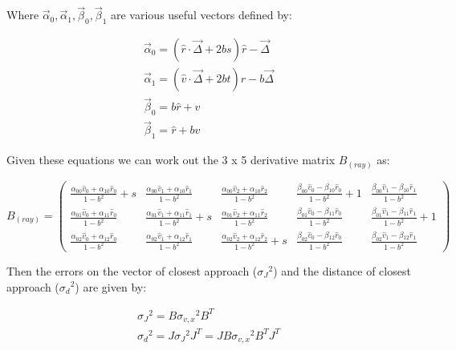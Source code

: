 \documentclass[fleqn,twoside,draft]{article}
\begin{document}
Where $\vec{\alpha}_0, \vec{\alpha}_1, \vec{\beta}_0, \vec{\beta}_1$ are various useful vectors defined by:

\begin{subequations}
\begin{gather}
  \vec{\alpha}_0 = (\hat{r} \cdot \vec{\Delta} + 2bs) \hat{r} - \vec{\Delta} \\
  \vec{\alpha}_1 = (\hat{v} \cdot \vec{\Delta} + 2bt) \hat{r} - b\vec{\Delta} \\
  \vec{\beta}_0 =  b\hat{r} + \hat{v} \\
  \vec{\beta}_1 =  \hat{r} + b\hat{v}
\end{gather}
\end{subequations}

Given these equations we can work out the 3 x 5 derivative matrix $B_{(ray)}$ as:

\begin{equation}
  B_{(ray)} = 
\begin{pmatrix}
    \frac{ \alpha_{00} \hat{v}_0 + \alpha_{10} \hat{r}_0}{ 1 - b^2 } + s & 
    \frac{ \alpha_{00} \hat{v}_1 + \alpha_{10} \hat{r}_1}{ 1 - b^2 } &
    \frac{ \alpha_{00} \hat{v}_2 + \alpha_{10} \hat{r}_2}{ 1 - b^2 } &
    \frac{ \beta_{00} \hat{v}_0 - \beta{_10} \hat{r}_0}{ 1 - b^2 } + 1 &
    \frac{ \beta_{00} \hat{v}_1 - \beta{_10} \hat{r}_1}{ 1 - b^2 } \\
    \frac{ \alpha_{01} \hat{v}_0 + \alpha_{11} \hat{r}_0}{ 1 - b^2 } & 
    \frac{ \alpha_{01} \hat{v}_1 + \alpha_{11} \hat{r}_1}{ 1 - b^2 } + s &
    \frac{ \alpha_{01} \hat{v}_2 + \alpha_{11} \hat{r}_2}{ 1 - b^2 } &
    \frac{ \beta_{01} \hat{v}_0 - \beta{_11} \hat{r}_0}{ 1 - b^2 } &
    \frac{ \beta_{01} \hat{v}_1 - \beta{_11} \hat{r}_1}{ 1 - b^2 } + 1 \\
    \frac{ \alpha_{02} \hat{v}_0 + \alpha_{12} \hat{r}_0}{ 1 - b^2 } & 
    \frac{ \alpha_{02} \hat{v}_1 + \alpha_{12} \hat{r}_1}{ 1 - b^2 } &
    \frac{ \alpha_{02} \hat{v}_2 + \alpha_{12} \hat{r}_2}{ 1 - b^2 } + s &
    \frac{ \beta_{02} \hat{v}_0 - \beta{_12} \hat{r}_0}{ 1 - b^2 } &
    \frac{ \beta_{02} \hat{v}_1 - \beta{_12} \hat{r}_1}{ 1 - b^2 }
\end{pmatrix}
\end{equation}

Then the errors on the vector of closest approach (${\sigma_{J}}^2$) and the distance of closest approach (${\sigma_{d}}^2$) are given by:

\begin{subequations}
\begin{gather}
  {\sigma_{J}}^2 =  B {\sigma_{v,x}}^2 B^T \\
  {\sigma_{d}}^2 =  J {\sigma_{J}}^2 J^T = J B {\sigma_{v,x}}^2 B^T J^T
\end{gather}
\end{subequations}
\end{document}
